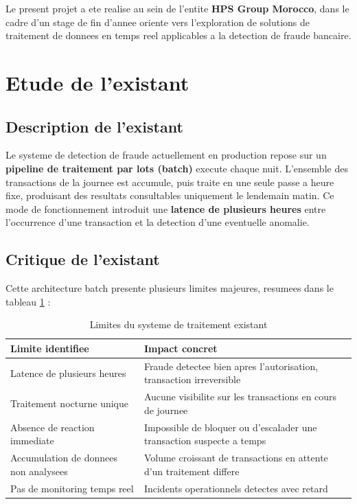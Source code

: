 Le present projet a ete realise au sein de l'entite \textbf{HPS Group Morocco}, dans
le cadre d'un stage de fin d'annee oriente vers l'exploration de solutions de traitement
de donnees en temps reel applicables a la detection de fraude bancaire.

\section{Etude de l'existant}
\label{sec:existant}

\subsection{Description de l'existant}

Le systeme de detection de fraude actuellement en production repose sur un
\textbf{pipeline de traitement par lots (batch)} execute chaque nuit. L'ensemble des
transactions de la journee est accumule, puis traite en une seule passe a heure fixe,
produisant des resultats consultables uniquement le lendemain matin. Ce mode de
fonctionnement introduit une \textbf{latence de plusieurs heures} entre l'occurrence
d'une transaction et la detection d'une eventuelle anomalie.

\subsection{Critique de l'existant}

Cette architecture batch presente plusieurs limites majeures, resumees dans le tableau
\ref{tab:limites-existant} :

\begin{table}[H]
\centering
\renewcommand{\arraystretch}{1.3}
\begin{tabularx}{\textwidth}{@{} l X @{}}
\toprule
\textbf{Limite identifiee} & \textbf{Impact concret} \\
\midrule
Latence de plusieurs heures & Fraude detectee bien apres l'autorisation, transaction irreversible \\
\rowcolor{gray!6}
Traitement nocturne unique & Aucune visibilite sur les transactions en cours de journee \\
Absence de reaction immediate & Impossible de bloquer ou d'escalader une transaction suspecte a temps \\
\rowcolor{gray!6}
Accumulation de donnees non analysees & Volume croissant de transactions en attente d'un traitement differe \\
Pas de monitoring temps reel & Incidents operationnels detectes avec retard \\
\bottomrule
\end{tabularx}
\caption{Limites du systeme de traitement existant}
\label{tab:limites-existant}
\end{table}

